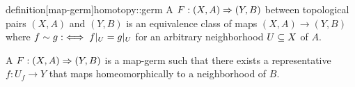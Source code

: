 \begin{mystatement}{definition}[map-germ]{homotopy::germ}
    A  $F: (X, A) \Rightarrow{} (Y, B)$ between topological pairs $(X, A)$ and $(Y, B)$ is an equivalence class of maps $(X, A) \to (Y, B)$
    where $f \sim g :\iff f\vert_{U} = g\vert_{U}$ for an arbitrary neighborhood $U \subseteq{} X$ of $A$. 
\end{mystatement}

\begin{myparagraph}
    A  $F: (X, A) \Rightarrow{} (Y, B)$ is a map-germ
    such that there exists a representative $f: U_f \to Y$ that maps homeomorphically to a neighborhood of $B$.  
\end{myparagraph}